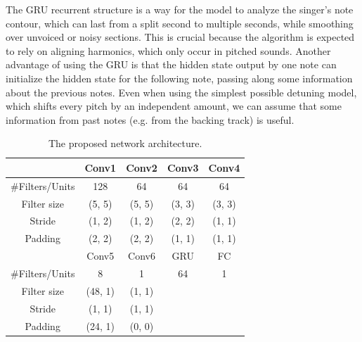 The GRU recurrent structure is a way for the model to analyze the singer's note contour, which can last from a split second to multiple seconds, while smoothing over unvoiced or noisy sections. This is crucial because the algorithm is expected to rely on aligning harmonics, which only occur in pitched sounds. Another advantage of using the GRU is that the hidden state output by one note can initialize the hidden state for the following note, passing along some information about the previous notes. Even when using the simplest possible detuning model, which shifts every pitch by an independent amount, we can assume that some information from past notes (e.g. from the backing track) is useful.

\begin{table}[t]
  \begin{center}
    \caption{The proposed network architecture.}
    \begin{tabular}{|c||c|c|c|c|}
    \hline
      & Conv1 & Conv2 & Conv3 & Conv4 \\
      \hline
      \#Filters/Units & 128 & 64 & 64 & 64 \\
      Filter size & (5, 5) & (5, 5) & (3, 3) & (3, 3) \\
      Stride & (1, 2) & (1, 2) & (2, 2) & (1, 1) \\
      Padding & (2, 2) & (2, 2) & (1, 1) & (1, 1) \\
      \hline
      & Conv5 & Conv6 & GRU & FC \\
      \hline
      \#Filters/Units & 8 & 1 & 64 & 1 \\
      Filter size & (48, 1) & (1, 1) & & \\
      Stride & (1, 1) & (1, 1) & & \\
      Padding & (24, 1) & (0, 0) & & \\
      \hline
    \end{tabular}
    \vspace{-.1in}
    \label{tab:network}
  \end{center}
\end{table}

